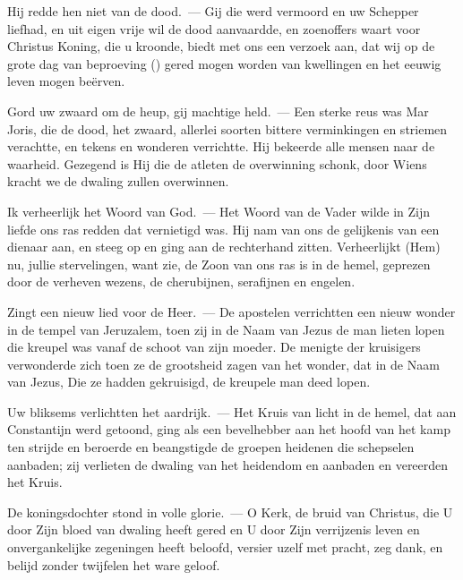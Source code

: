 \documentclass[12pt,twoside,a5paper]{article}
\begin{document}
\begin{halfparskip}
  Hij redde hen niet van de dood.~--- Gij die werd vermoord en uw Schepper liefhad, en uit eigen vrije wil de dood aanvaardde, en zoenoffers waart voor Christus Koning, die u kroonde, biedt met ons een verzoek aan, dat wij op de grote dag van beproeving () gered mogen worden van kwellingen en het eeuwig leven mogen beërven.

  Gord uw zwaard om de heup, gij machtige held.~--- Een sterke reus was Mar Joris, die de dood, het zwaard, allerlei soorten bittere verminkingen en striemen verachtte, en tekens en wonderen verrichtte. Hij bekeerde alle mensen naar de waarheid. Gezegend is Hij die de atleten de overwinning schonk, door Wiens kracht we de dwaling zullen overwinnen.

  Ik verheerlijk het Woord van God.~--- Het Woord van de Vader wilde in Zijn liefde ons ras redden dat vernietigd was. Hij nam van ons de gelijkenis van een dienaar aan, en steeg op en ging aan de rechterhand zitten. Verheerlijkt (Hem) nu, jullie stervelingen, want zie, de Zoon van ons ras is in de hemel, geprezen door de verheven wezens, de cherubijnen, serafijnen en engelen.

  Zingt een nieuw lied voor de Heer.~--- De apostelen verrichtten een nieuw wonder in de tempel van Jeruzalem, toen zij in de Naam van Jezus de man lieten lopen die kreupel was vanaf de schoot van zijn moeder. De menigte der kruisigers verwonderde zich toen ze de grootsheid zagen van het wonder, dat in de Naam van Jezus, Die ze hadden gekruisigd, de kreupele man deed lopen.

  Uw bliksems verlichtten het aardrijk.~--- Het Kruis van licht in de hemel, dat aan Constantijn werd getoond, ging als een bevelhebber aan het hoofd van het kamp ten strijde en beroerde en beangstigde de groepen heidenen die schepselen aanbaden; zij verlieten de dwaling van het heidendom en aanbaden en vereerden het Kruis.

  De koningsdochter stond in volle glorie.~--- O Kerk, de bruid van Christus, die U door Zijn bloed van dwaling heeft gered en U door Zijn verrijzenis leven en onvergankelijke zegeningen heeft beloofd, versier uzelf met pracht, zeg dank, en belijd zonder twijfelen het ware geloof.
\end{halfparskip}
\end{document}
